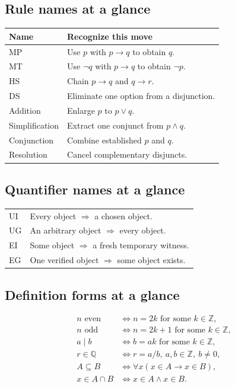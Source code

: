 \documentclass[10pt]{article}
\newcommand{\Z}{\mathbb Z}
\newcommand{\Q}{\mathbb Q}
\begin{document}
\begin{multicols}{2}
\raggedcolumns
\subsection*{Rule names at a glance}
\begin{center}
\renewcommand{\arraystretch}{1.18}
\begin{tabularx}{\linewidth}{@{}lY@{}}
\toprule
\textbf{Name} & \textbf{Recognize this move} \\
\midrule
MP & Use $p$ with $p\to q$ to obtain $q$. \\
MT & Use $\neg q$ with $p\to q$ to obtain $\neg p$. \\
HS & Chain $p\to q$ and $q\to r$. \\
DS & Eliminate one option from a disjunction. \\
Addition & Enlarge $p$ to $p\lor q$. \\
Simplification & Extract one conjunct from $p\land q$. \\
Conjunction & Combine established $p$ and $q$. \\
Resolution & Cancel complementary disjuncts. \\
\bottomrule
\end{tabularx}
\end{center}

\subsection*{Quantifier names at a glance}
\begin{center}
\renewcommand{\arraystretch}{1.18}
\begin{tabularx}{\linewidth}{@{}lY@{}}
\toprule
UI & Every object $\Rightarrow$ a chosen object. \\
UG & An arbitrary object $\Rightarrow$ every object. \\
EI & Some object $\Rightarrow$ a fresh temporary witness. \\
EG & One verified object $\Rightarrow$ some object exists. \\
\bottomrule
\end{tabularx}
\end{center}

\columnbreak
\subsection*{Definition forms at a glance}
\[
\begin{aligned}
n\text{ even}&\iff n=2k\text{ for some }k\in\Z,\\
n\text{ odd}&\iff n=2k+1\text{ for some }k\in\Z,\\
a\mid b&\iff b=ak\text{ for some }k\in\Z,\\
r\in\Q&\iff r=a/b,\ a,b\in\Z,\ b\ne0,\\
A\subseteq B&\iff \forall x(x\in A\to x\in B),\\
x\in A\cap B&\iff x\in A\land x\in B.
\end{aligned}
\]


\end{multicols}
\end{document}
